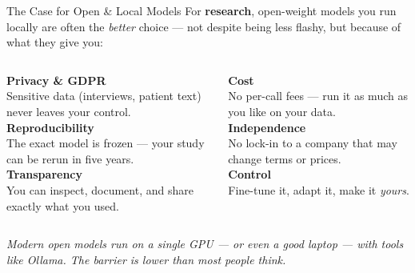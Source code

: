 \documentclass[aspectratio=169]{beamer}
\begin{document}
\begin{frame}{The Case for Open \& Local Models}
\vspace{0.2cm}
{\small For \textbf{research}, open-weight models you run locally are often the
\emph{better} choice --- not despite being less flashy, but because of what they give you:}

\medskip
\begin{columns}[T]
  \vspace{0pt}
  {\small
  \textcolor{wurgreen}{\faShieldAlt}\enspace \textbf{Privacy \& GDPR}\\
  {\footnotesize Sensitive data (interviews, patient text) never leaves your control.}\\[7pt]
  \textcolor{wurgreen}{\faRedo}\enspace \textbf{Reproducibility}\\
  {\footnotesize The exact model is frozen --- your study can be rerun in five years.}\\[7pt]
  \textcolor{wurgreen}{\faSearchPlus}\enspace \textbf{Transparency}\\
  {\footnotesize You can inspect, document, and share exactly what you used.}}

  \vspace{0pt}
  {\small
  \textcolor{wurgreen}{\faEuroSign}\enspace \textbf{Cost}\\
  {\footnotesize No per-call fees --- run it as much as you like on your data.}\\[7pt]
  \textcolor{wurgreen}{\faUnlock}\enspace \textbf{Independence}\\
  {\footnotesize No lock-in to a company that may change terms or prices.}\\[7pt]
  \textcolor{wurgreen}{\faWrench}\enspace \textbf{Control}\\
  {\footnotesize Fine-tune it, adapt it, make it \emph{yours}.}}
\end{columns}

\medskip
{\small\textcolor{midgray}{\textit{Modern open models run on a single GPU --- or even a good
laptop --- with tools like Ollama. The barrier is lower than most people think.}}}
\end{frame}
\end{document}

